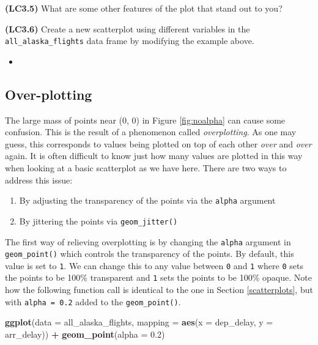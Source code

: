 \documentclass[12pt,]{krantz}
\makeatletter
\newenvironment{Shaded}{\begin{snugshade}}{\end{snugshade}}
\newcommand{\KeywordTok}[1]{\textcolor[rgb]{0.27,0.27,0.27}{\textbf{#1}}}
\newcommand{\DataTypeTok}[1]{\textcolor[rgb]{0.27,0.27,0.27}{#1}}
\newcommand{\FloatTok}[1]{\textcolor[rgb]{0.06,0.06,0.06}{#1}}
\newcommand{\StringTok}[1]{\textcolor[rgb]{0.5,0.5,0.5}{#1}}
\newcommand{\OperatorTok}[1]{\textcolor[rgb]{0.43,0.43,0.43}{\textbf{#1}}}
\newcommand{\NormalTok}[1]{#1}
\providecommand{\tightlist}{%
  \setlength{\itemsep}{0pt}\setlength{\parskip}{0pt}}
\newenvironment{kframe}{%
\medskip{}
\setlength{\fboxsep}{.8em}
 \def\at@end@of@kframe{}%
 \ifinner\ifhmode%
  \def\at@end@of@kframe{\end{minipage}}%
  \begin{minipage}{\columnwidth}%
 \fi\fi%
 \def\FrameCommand##1{\hskip\@totalleftmargin \hskip-\fboxsep
 \colorbox{shadecolor}{##1}\hskip-\fboxsep
     \hskip-\linewidth \hskip-\@totalleftmargin \hskip\columnwidth}%
 \MakeFramed {\advance\hsize-\width
   \@totalleftmargin\z@ \linewidth\hsize
   \@setminipage}}%
 {\par\unskip\endMakeFramed%
 \at@end@of@kframe}
\renewenvironment{Shaded}{\begin{kframe}}{\end{kframe}}
\newenvironment{rmdblock}[1]
  {\begin{shaded*}
  \begin{itemize}
  \renewcommand{\labelitemi}{
    \raisebox{-.7\height}[0pt][0pt]{
    }
  }
  \item
  }
  {
  \end{itemize}
  \end{shaded*}
  }
\newenvironment{learncheck}
  {\begin{rmdblock}{warning}}
  {\end{rmdblock}}
\theoremstyle{definition}
\theoremstyle{definition}
\theoremstyle{definition}
\theoremstyle{remark}
\makeatother
\begin{document}
\textbf{(LC3.5)} What are some other features of the plot that stand out
to you?

\textbf{(LC3.6)} Create a new scatterplot using different variables in
the \texttt{all\_alaska\_flights} data frame by modifying the example
above.

\begin{learncheck}

\end{learncheck}

\subsection{Over-plotting}\label{overplotting}

The large mass of points near (0, 0) in Figure \ref{fig:noalpha} can
cause some confusion. This is the result of a phenomenon called
\emph{overplotting}. As one may guess, this corresponds to values being
plotted on top of each other \emph{over} and \emph{over} again. It is
often difficult to know just how many values are plotted in this way
when looking at a basic scatterplot as we have here. There are two ways
to address this issue:

\begin{enumerate}
\def\labelenumi{\arabic{enumi}.}
\tightlist
\item
  By adjusting the transparency of the points via the \texttt{alpha}
  argument
\item
  By jittering the points via \texttt{geom\_jitter()}
\end{enumerate}

The first way of relieving overplotting is by changing the
\texttt{alpha} argument in \texttt{geom\_point()} which controls the
transparency of the points. By default, this value is set to \texttt{1}.
We can change this to any value between \texttt{0} and \texttt{1} where
\texttt{0} sets the points to be 100\% transparent and \texttt{1} sets
the points to be 100\% opaque. Note how the following function call is
identical to the one in Section \ref{scatterplots}, but with
\texttt{alpha\ =\ 0.2} added to the \texttt{geom\_point()}.

\begin{Shaded}
\begin{Highlighting}[]
\KeywordTok{ggplot}\NormalTok{(}\DataTypeTok{data =}\NormalTok{ all_alaska_flights, }
       \DataTypeTok{mapping =} \KeywordTok{aes}\NormalTok{(}\DataTypeTok{x =}\NormalTok{ dep_delay, }\DataTypeTok{y =}\NormalTok{ arr_delay)) }\OperatorTok{+}\StringTok{ }
\StringTok{  }\KeywordTok{geom_point}\NormalTok{(}\DataTypeTok{alpha =} \FloatTok{0.2}\NormalTok{)}
\end{Highlighting}
\end{Shaded}
\end{document}
